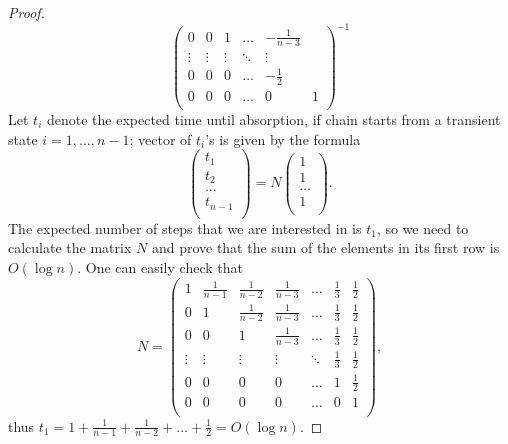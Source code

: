 \documentclass[a4paper,USenglish]{socg-lipics-v2018}
\begin{document}
\begin{proof}
\begin{equation}
\begin{pmatrix}
         0      &  0             & 1             & \dots  & -\frac{1}{n-3}   \\
         \vdots &  \vdots       & \vdots        & \ddots & \vdots            \\
         0      &  0            & 0             & \dots  & -\frac{1}{2}      \\
         0      &  0            & 0             & \dots  & 0           & 1   \\
        \end{pmatrix}^{-1}
\end{equation}
Let $t_i$ denote the expected time
until absorption, if chain starts from a transient state $i = 1, \dots, n-1$; 
vector of $t_i$'s is given by the formula
\[
\begin{pmatrix}
      t_1 \\
      t_2 \\
      \dots \\
      t_{n-1} \\
      \end{pmatrix}
= N \begin{pmatrix}
      1 \\
      1 \\
      \dots \\
      1 \\
      \end{pmatrix}.
\]
The expected number of steps that we are interested in is $t_1$, so we need to calculate the matrix $N$
and prove that the sum of the elements in its first row is $O(\log n)$.
One can easily check that
\[
N  =  \begin{pmatrix}
      1 & \frac{1}{n-1} & \frac{1}{n-2} & \frac{1}{n-3} & \dots  & \frac{1}{3} & \frac{1}{2} \\
      0 &             1 & \frac{1}{n-2} & \frac{1}{n-3} & \dots  & \frac{1}{3} & \frac{1}{2} \\
      0 &             0 &            1  & \frac{1}{n-3} & \dots  & \frac{1}{3} & \frac{1}{2} \\
 \vdots &        \vdots &  \vdots       & \vdots        & \ddots & \frac{1}{3} & \frac{1}{2} \\
      0 &             0 &            0  &            0  &  \dots &            1 & \frac{1}{2} \\
      0 &             0 &            0  &            0  &  \dots &            0 &           1 \\
      \end{pmatrix},
\]
thus $t_1 = 1 + \frac{1}{n-1} + \frac{1}{n-2} + \dots + \frac{1}{2} = O(\log n)$.
\end{proof}
\end{document}
